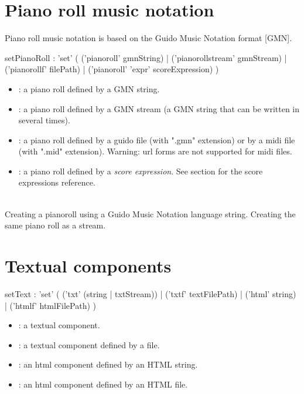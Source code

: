 \documentclass[a4paper,twoside]{report}
\newcommand{\sublevel}[1]	{\section{#1}}
\begin{document}
\sublevel{Piano roll music notation}
\label{pianorollscore}
Piano roll music notation is based on the Guido Music Notation format [GMN].


\begin{rail}
setPianoRoll : 'set' (
	('pianoroll' gmnString) |
	('pianorollstream' gmnStream) |
	('pianorollf' filePath) |
	('pianoroll' 'expr' scoreExpression)
)
\end{rail}

\begin{itemize}
\item {}: a piano roll defined by a GMN string.
\item {}: a piano roll defined by a GMN stream (a GMN string that can be written in several times).
\item {}: a piano roll defined by a guido file (with ".gmn" extension) or by a midi file (with ".mid" extension). Warning: url forms are not supported for midi files.
\item {}: a piano roll defined by a \emph{score expression}. See section  for the score expressions reference.
\end{itemize}

\example \\
Creating a pianoroll using a Guido Music Notation language string.
Creating the same piano roll as a stream.
\sample{/ITL/scene/myObject set pianorollstream "[ a";\\
/ITL/scene/myObject write "b";\\
/ITL/scene/myObject write "g";
}

\sublevel{Textual components}
\label{textscore}


\begin{rail}
setText : 'set' (
	('txt' (string | txtStream)) |
	('txtf' textFilePath) |
	('html' string) |
	('htmlf' htmlFilePath)
)
\end{rail}

\begin{itemize}
\item {}: a textual component.
\item {}: a textual component defined by a file.
\item {}: an html component defined by an HTML string.
\item {}: an html component defined by an HTML file.
\end{itemize}
\end{document}

